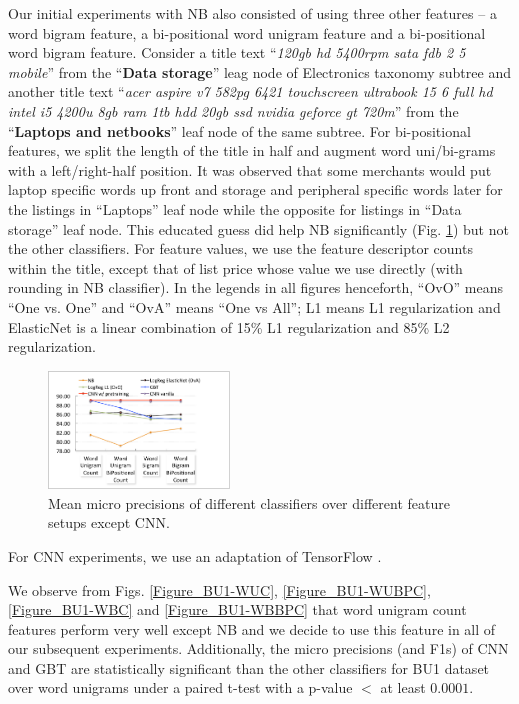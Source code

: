 Our initial experiments with NB also consisted of using three other features -- a word bigram feature, a bi-positional word unigram feature and a bi-positional word bigram feature.
Consider a title text ``\textit{120gb hd 5400rpm sata fdb 2 5 mobile}'' from the ``\textbf{Data storage}'' leag node of Electronics taxonomy subtree and another title text ``\textit{acer aspire v7 582pg 6421 touchscreen ultrabook 15 6 full hd intel i5 4200u 8gb ram 1tb hdd 20gb ssd nvidia geforce gt 720m}'' from the ``\textbf{Laptops and netbooks}'' leaf node of the same subtree.
For bi-positional features, we split the length of the title in half and augment word uni/bi-grams with a left/right-half position. It was observed that some merchants would put laptop specific words up front and storage and peripheral specific words later for the listings in ``Laptops'' leaf node while the opposite for listings in ``Data storage'' leaf node.
This educated guess did help NB significantly (Fig. \ref{Figure_BU1-predictions-feature-averages}) but not the other classifiers.
For feature values, we use the feature descriptor counts within the title, except that of list price whose value we use directly (with rounding in NB classifier).
In the legends in all figures henceforth, ``OvO'' means ``One vs. One'' and ``OvA'' means ``One vs All''; L1 means L1 regularization \cite{LibLinear} and ElasticNet \cite{Zou05:EN} is a linear combination of 15\% L1 regularization and 85\% L2 regularization.
\begin{figure}
	\vspace{-0.6cm}
	\centering
	\includegraphics[width=0.43\textwidth]{images/BU1-mean-micro-precision}
	\caption{\small{Mean micro precisions of different classifiers over different feature setups except CNN.}}
	\label{Figure_BU1-predictions-feature-averages}
	\vspace{-0.4cm}
\end{figure}
For CNN experiments, we use an adaptation of TensorFlow \cite{TensorFlow}.

We observe from Figs. \ref{Figure_BU1-WUC}, \ref{Figure_BU1-WUBPC}, \ref{Figure_BU1-WBC} and \ref{Figure_BU1-WBBPC} that word unigram count features perform very well except NB and we decide to use this feature in all of our subsequent experiments.
Additionally, the micro precisions (and F1s) of CNN and GBT are statistically significant than the other classifiers for BU1 dataset over word unigrams under a paired t-test with a p-value $<$ at least $0.0001$. 




